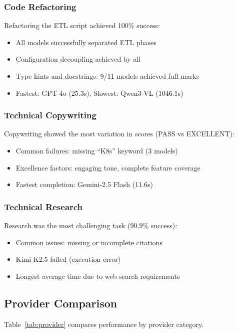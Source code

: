 \subsubsection{Code Refactoring}
Refactoring the ETL script achieved 100\% success:
\begin{itemize}
    \item All models successfully separated ETL phases
    \item Configuration decoupling achieved by all
    \item Type hints and docstrings: 9/11 models achieved full marks
    \item Fastest: GPT-4o (25.3s), Slowest: Qwen3-VL (1046.1s)
\end{itemize}

\subsubsection{Technical Copywriting}
Copywriting showed the most variation in scores (PASS vs EXCELLENT):
\begin{itemize}
    \item Common failures: missing ``K8s'' keyword (3 models)
    \item Excellence factors: engaging tone, complete feature coverage
    \item Fastest completion: Gemini-2.5 Flash (11.6s)
\end{itemize}

\subsubsection{Technical Research}
Research was the most challenging task (90.9\% success):
\begin{itemize}
    \item Common issues: missing or incomplete citations
    \item Kimi-K2.5 failed (execution error)
    \item Longest average time due to web search requirements
\end{itemize}

\subsection{Provider Comparison}
\label{sec:provider}

Table~\ref{tab:provider} compares performance by provider category.

